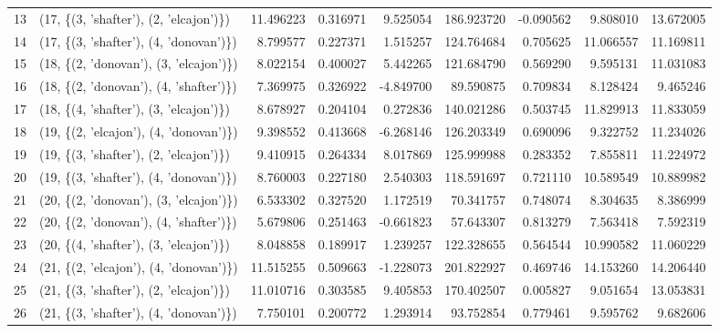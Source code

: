 \begin{tabular}{llrrrrrrr}
13 &  (17, \{(3, 'shafter'), (2, 'elcajon')\}) &  11.496223 &  0.316971 &  9.525054 &  186.923720 & -0.090562 &   9.808010 &  13.672005 \\
14 &  (17, \{(3, 'shafter'), (4, 'donovan')\}) &   8.799577 &  0.227371 &  1.515257 &  124.764684 &  0.705625 &  11.066557 &  11.169811 \\
15 &  (18, \{(2, 'donovan'), (3, 'elcajon')\}) &   8.022154 &  0.400027 &  5.442265 &  121.684790 &  0.569290 &   9.595131 &  11.031083 \\
16 &  (18, \{(2, 'donovan'), (4, 'shafter')\}) &   7.369975 &  0.326922 & -4.849700 &   89.590875 &  0.709834 &   8.128424 &   9.465246 \\
17 &  (18, \{(4, 'shafter'), (3, 'elcajon')\}) &   8.678927 &  0.204104 &  0.272836 &  140.021286 &  0.503745 &  11.829913 &  11.833059 \\
18 &  (19, \{(2, 'elcajon'), (4, 'donovan')\}) &   9.398552 &  0.413668 & -6.268146 &  126.203349 &  0.690096 &   9.322752 &  11.234026 \\
19 &  (19, \{(3, 'shafter'), (2, 'elcajon')\}) &   9.410915 &  0.264334 &  8.017869 &  125.999988 &  0.283352 &   7.855811 &  11.224972 \\
20 &  (19, \{(3, 'shafter'), (4, 'donovan')\}) &   8.760003 &  0.227180 &  2.540303 &  118.591697 &  0.721110 &  10.589549 &  10.889982 \\
21 &  (20, \{(2, 'donovan'), (3, 'elcajon')\}) &   6.533302 &  0.327520 &  1.172519 &   70.341757 &  0.748074 &   8.304635 &   8.386999 \\
22 &  (20, \{(2, 'donovan'), (4, 'shafter')\}) &   5.679806 &  0.251463 & -0.661823 &   57.643307 &  0.813279 &   7.563418 &   7.592319 \\
23 &  (20, \{(4, 'shafter'), (3, 'elcajon')\}) &   8.048858 &  0.189917 &  1.239257 &  122.328655 &  0.564544 &  10.990582 &  11.060229 \\
24 &  (21, \{(2, 'elcajon'), (4, 'donovan')\}) &  11.515255 &  0.509663 & -1.228073 &  201.822927 &  0.469746 &  14.153260 &  14.206440 \\
25 &  (21, \{(3, 'shafter'), (2, 'elcajon')\}) &  11.010716 &  0.303585 &  9.405853 &  170.402507 &  0.005827 &   9.051654 &  13.053831 \\
26 &  (21, \{(3, 'shafter'), (4, 'donovan')\}) &   7.750101 &  0.200772 &  1.293914 &   93.752854 &  0.779461 &   9.595762 &   9.682606 \\
\bottomrule
\end{tabular}
